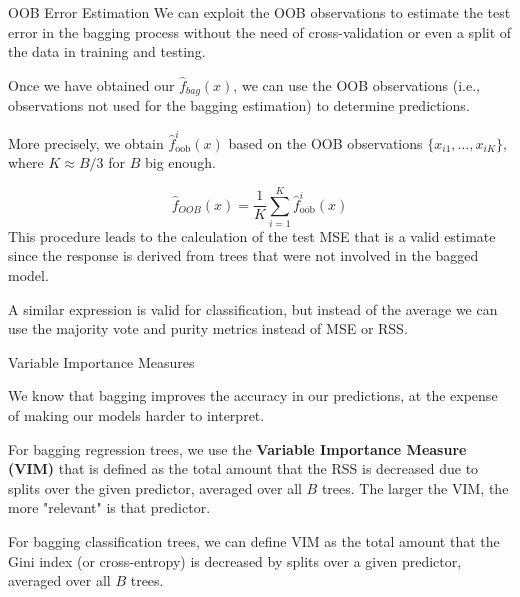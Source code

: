 \documentclass{beamer}
\begin{document}
	\begin{frame}{OOB Error Estimation}
		We can exploit the OOB observations to estimate the test error in the bagging process without the need of cross-validation or even a split of the data in training and testing.
		
		Once we have obtained our $\hat{f}_{bag}(x)$, we can use the OOB observations (i.e., observations not used for the bagging estimation) to determine predictions. 
		
		More precisely, we obtain $\hat{f}_{\textrm{oob}}^i (x)$ based on the OOB observations $\{x_{i1},\ldots, x_{iK}\}$, where $K \approx B/3$ for $B$ big enough. 
		
		
		
		
		\begin{equation*}
			\hat{f}_{OOB}(x)= \frac{1}{K}\sum_{i=1}^{K} \hat{f}^{i}_{\textrm{oob}}(x)
		\end{equation*}
		This procedure leads to the calculation of the test MSE that is a valid estimate since the response is derived from trees that were not involved in the bagged model.
		
		A similar expression is valid for classification, but instead of the average we can use the majority vote and purity metrics instead of MSE or RSS. 
	\end{frame}
	
	
	\begin{frame}{Variable Importance Measures}
		
		We know that bagging improves the accuracy in our predictions, at the expense of making our models harder to interpret. 
		
		For bagging regression trees, we use the {\bf Variable Importance Measure (VIM)} that is defined as the total amount that the RSS is decreased due to splits over the given predictor, averaged over all $B$ trees.  The larger the VIM, the more "relevant" is that predictor.
		
		For bagging classification trees, we can define VIM as the total amount that the Gini index (or cross-entropy) is decreased by splits over a given predictor, averaged over all $B$ trees. 
	\end{frame}
	
\end{document}
